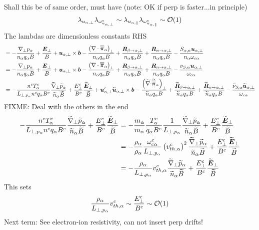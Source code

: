 %
Shall this be of same order, must have (note: OK if perp is faster...in principle)
%
\begin{align*}
 \lambda_{u_{\alpha,\perp}}
 \lambda_{\omega^c_{u_{\alpha,\perp}}}
 \sim
 \lambda_{u_{\alpha,\|}}
 \lambda_{\omega^c_{u_{\alpha,\|}}}
 \sim
 \mathcal{O}(1)
\end{align*}
%
The lambdas are dimensionless constants
%
RHS
%
\begin{align*}
&=
- \frac{ \nabla_\perp p_\alpha }{n_\alpha  q_\alpha B}
+ \frac{\boldsymbol{E}_\perp}{B}
+ \boldsymbol{u}_{\alpha,\perp}\times\boldsymbol{b}
- \frac{ \left(\nabla\cdot\boldsymbol{\overline{\overline{\pi}}}_\alpha\right)_\perp }{n_\alpha  q_\alpha B}
+ \frac{ \boldsymbol{R}_{\beta \to \alpha,\perp} }{n_\alpha q_\alpha B}
+ \frac{ \boldsymbol{R}_{n \to \alpha,\perp} }{n_\alpha q_\alpha B}
- \frac{ S_{\alpha,n}\boldsymbol{u}_{\alpha,\perp} }{n_\alpha \omega_{c\alpha}}
\\
&=
- \frac{ \nabla_\perp p_\alpha }{n_\alpha  q_\alpha B}
+ \frac{\boldsymbol{E}_\perp}{B}
+ \boldsymbol{u}_{\alpha,\perp}\times\boldsymbol{b}
- \frac{ \left(\nabla\cdot\boldsymbol{\overline{\overline{\pi}}}_\alpha\right)_\perp }{n_\alpha  q_\alpha B}
+ \frac{ \boldsymbol{R}_{\beta \to \alpha,\perp} }{n_\alpha q_\alpha B}
+ \frac{ \boldsymbol{R}_{n \to \alpha,\perp} }{n_\alpha q_\alpha B}
- \frac{ \nu_{S,\alpha}\boldsymbol{u}_{\alpha,\perp} }{\omega_{c\alpha}}
\\
&=
- \frac{n^c T^c_\alpha}{L_{\perp, p_\alpha}n^cq_\alpha B^c}
\frac{ \widetilde{ \nabla}_\perp \widetilde{ p}_\alpha }{\widetilde{ n}_\alpha \widetilde{ B}}
+ \frac{E_\perp^c}{B^c}
\frac{\widetilde{ \boldsymbol{E}}_\perp}{\widetilde{ B}}
+ \boldsymbol{u}^c_{\alpha,\perp}
\widetilde{ \boldsymbol{u}}_{\alpha,\perp}\times\boldsymbol{b}
- \frac{ \left(\widetilde{ \nabla\cdot}\widetilde{ \boldsymbol{\overline{\overline{\pi}}}}_\alpha\right)_\perp }{\widetilde{ n}_\alpha  q_\alpha B}
+ \frac{ \widetilde{ \boldsymbol{R}}_{\beta \to \alpha,\perp} }{\widetilde{ n}_\alpha q_\alpha B}
+ \frac{ \widetilde{ \boldsymbol{R}}_{n \to \alpha,\perp} }{\widetilde{ n}_\alpha q_\alpha B}
- \frac{ \widetilde{ \nu}_{S,\alpha}\widetilde{ \boldsymbol{u}}_{\alpha,\perp} }{\omega_{c\alpha}}
\end{align*}
%
FIXME: Deal with the others in the end
%
\begin{align*}
- \frac{n^c T^c_\a}{L_{\perp, p_\a}n^cq_\a B^c}
\frac{ \wt{\grad}_\perp \wt{p}_\a }{\wt{n}_\a \wt{B}}
+ \frac{E_\perp^c}{B^c}
\frac{\wt{\ve{E}}_\perp}{\wt{B}}
&=
- \frac{m_\a}{m_\a}\frac{T^c_\a}{q_\a B^c}
\frac{1}{L_{\perp, p_\a}}
\frac{ \wt{\grad}_\perp \wt{p}_\a }{\wt{n}_\a \wt{B}}
+ \frac{E_\perp^c}{B^c}
\frac{\wt{\ve{E}}_\perp}{\wt{B}}
\\
%
%
&=
- \frac{\rho_\a}{\rho_\a}
\frac{\om^c_{c\a}}{L_{\perp, p_\a}}\L(v^c_{th,\a}\R)^2
\frac{ \wt{\grad}_\perp \wt{p}_\a }{\wt{n}_\a \wt{B}}
+ \frac{E_\perp^c}{B^c}
\frac{\wt{\ve{E}}_\perp}{\wt{B}}
\\
%
%
&=
- \frac{\rho_\a}{L_{\perp, p_\a}}v^c_{th,\a}
\frac{ \wt{\grad}_\perp \wt{p}_\a }{\wt{n}_\a \wt{B}}
+ \frac{E_\perp^c}{B^c}
\frac{\wt{\ve{E}}_\perp}{\wt{B}}
\end{align*}
%
This sets
%
\begin{align*}
    \frac{\rho_{\alpha}}{L_{\perp, p_\alpha}}v^c_{th,\alpha} \sim \frac{E_\perp^c}{B^c} \sim \mathcal{O}(1)
\end{align*}
%
%
Next term: See electron-ion resistivity, can not insert perp drifts!

